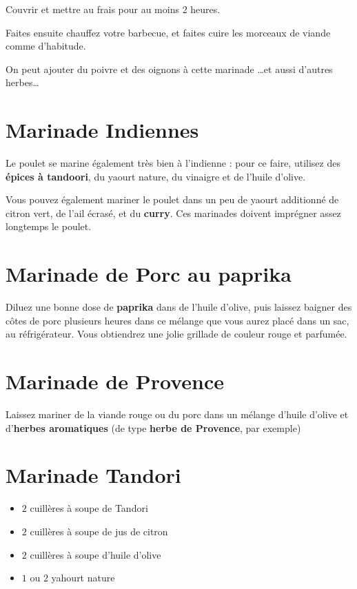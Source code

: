 Couvrir et mettre au frais pour au moins 2 heures.

Faites ensuite chauffez votre barbecue, et faites cuire les morceaux de viande comme d'habitude.


\begin{remarque}
On peut ajouter du poivre et des oignons à cette marinade \dots  et aussi d'autres herbes\dots
\end{remarque}

\section{Marinade Indiennes}
Le poulet se marine également très bien à l'indienne : pour ce faire, utilisez des \textbf{épices à tandoori}, du yaourt nature, du vinaigre et de l'huile d'olive.

Vous pouvez également mariner le poulet dans un peu de yaourt additionné de citron vert, de l'ail écrasé, et du \textbf{curry}. Ces marinades doivent imprégner assez longtemps le poulet.

\section{Marinade de Porc au paprika}
Diluez une bonne dose de \textbf{paprika} dans de l'huile d'olive, puis laissez baigner des côtes de porc plusieurs heures dans ce mélange que vous aurez placé dans un sac, au réfrigérateur. Vous obtiendrez une jolie grillade de couleur rouge et parfumée.

\section{Marinade de Provence}
Laissez mariner de la viande rouge ou du porc dans un mélange d'huile d'olive et d'\textbf{herbes aromatiques} (de type \textbf{herbe de Provence}, par exemple)

\section{Marinade Tandori}
\begin{itemize}
\item $2$ cuillères à soupe de Tandori
\item $2$ cuillères à soupe de jus de citron
\item $2$ cuillères à soupe d'huile d'olive
\item $1$ ou $2$ yahourt nature
\end{itemize}

